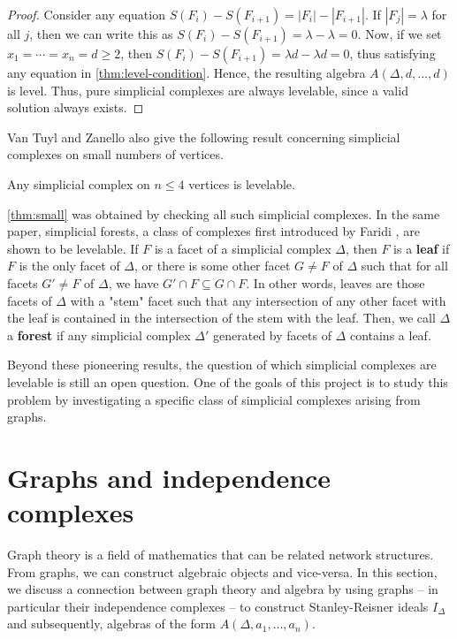 \begin{proof}
Consider any equation $S(F_i) - S(F_{i+1}) = |F_i| - |F_{i+1}|$. If $|F_j| = \lambda$ for all $j$, then we can write this as $S(F_i) - S(F_{i+1}) = \lambda - \lambda = 0$. Now, if we set $x_1 = \cdots = x_n = d \geq 2$, then $S(F_i) - S(F_{i+1}) = \lambda d - \lambda d = 0$, thus satisfying any equation in \autoref{thm:level-condition}. Hence, the resulting algebra $A(\Delta, d, \dots, d)$ is level. Thus, pure simplicial complexes are always levelable, since a valid solution always exists.
\end{proof}

Van Tuyl and Zanello \cite{VanTuyl2010} also give the following result concerning simplicial complexes on small numbers of vertices.

\begin{theorem} \label{thm:small}
Any simplicial complex on $n \leq 4$ vertices is levelable. 
\end{theorem}

\autoref{thm:small} was obtained by checking all such simplicial complexes. In the same paper, simplicial forests, a class of complexes first introduced by Faridi \cite{Faridi2002}, are shown to be levelable. If $F$ is a facet of a simplicial complex $\Delta$, then $F$ is a \textbf{leaf} if $F$ is the only facet of $\Delta$, or there is some other facet $G \neq F$ of $\Delta$ such that for all facets $G' \neq F$ of $\Delta$, we have $G' \cap F \subseteq G \cap F$. In other words, leaves are those facets of $\Delta$ with a "stem" facet such that any intersection of any other facet with the leaf is contained in the intersection of the stem with the leaf. Then, we call $\Delta$ a \textbf{forest} if any simplicial complex $\Delta'$ generated by facets of $\Delta$ contains a leaf. 

Beyond these pioneering results, the question of which simplicial complexes are levelable is still an open question. One of the goals of this project is to study this problem by investigating a specific class of simplicial complexes arising from graphs.

\section{Graphs and independence complexes} \label{sec:bg-graphs}

Graph theory is a field of mathematics that can be related network structures. From graphs, we can construct algebraic objects and vice-versa. In this section, we discuss a connection between graph theory and algebra by using graphs -- in particular their independence complexes -- to construct Stanley-Reisner ideals $I_\Delta$ and subsequently, algebras of the form $A(\Delta, a_1 , \dots, a_n)$.

